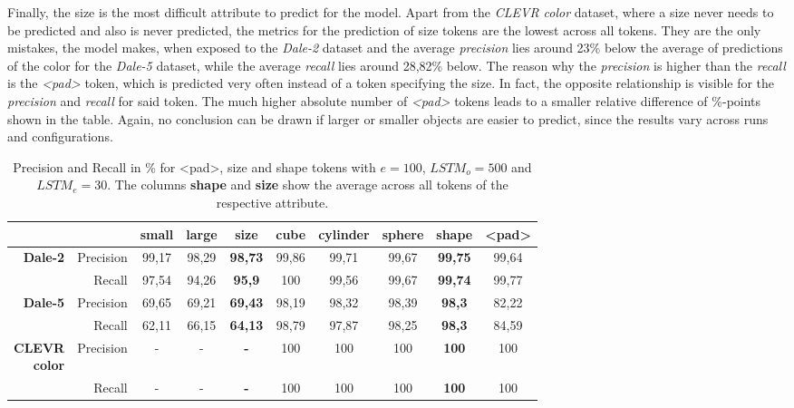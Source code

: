Finally, the size is the most difficult attribute to predict for the model.
Apart from the \emph{CLEVR color} dataset, where a size never needs to be predicted and also is never predicted, the metrics for the prediction of size tokens are the lowest across all tokens.
They are the only mistakes, the model makes, when exposed to the \emph{Dale-2} dataset and the average \emph{precision} lies around 23\% below the average of predictions of the color for the \emph{Dale-5} dataset, while the average \emph{recall} lies around 28,82\% below.
The reason why the \emph{precision} is higher than the \emph{recall} is the \emph{<pad>} token, which is predicted very often instead of a token specifying the size.
In fact, the opposite relationship is visible for the \emph{precision} and \emph{recall} for said token.
The much higher absolute number of \emph{<pad>} tokens leads to a smaller relative difference of \%-points shown in the table.
Again, no conclusion can be drawn if larger or smaller objects are easier to predict, since the results vary across runs and configurations.

\begin{table}[ht]
    \centering
    \begin{tabular}{rr|cc|c|ccc|c|c}
        \toprule
                                         &             & {small} & {large} & \textbf{size}  & {cube}  & {cylinder} & {sphere} & \textbf{shape} & {<pad>} \\\midrule
        \multirow{2}{*}{\textbf{Dale-2}} & {Precision} & {99,17} & {98,29} & \textbf{98,73} & {99,86} & {99,71}    & {99,67}  & \textbf{99,75} & {99,64} \\
                                         & {Recall}    & {97,54} & {94,26} & \textbf{95,9}  & {100}   & {99,56}    & {99,67}  & \textbf{99,74} & {99,77} \\\midrule
        \multirow{2}{*}{\textbf{Dale-5}} & {Precision} & {69,65} & {69,21} & \textbf{69,43} & {98,19} & {98,32}    & {98,39}  & \textbf{98,3}  & {82,22} \\
                                         & {Recall}    & {62,11} & {66,15} & \textbf{64,13} & {98,79} & {97,87}    & {98,25}  & \textbf{98,3}  & {84,59} \\\midrule
        \multirowcell{2}[0pt][r]{\textbf{CLEVR}                                                                                                          \\\textbf{color}} & {Precision}  & {-}     & {-}     & \textbf{-}     & {100}   & {100}      & {100}    & \textbf{100}   & {100}   \\
                                         & {Recall}    & {-}     & {-}     & \textbf{-}     & {100}   & {100}      & {100}    & \textbf{100}   & {100}   \\
        \bottomrule
    \end{tabular}
    \caption{Precision and Recall in \% for <pad>, size and shape tokens with $e=100$, $LSTM_o=500$ and $LSTM_e=30$. The columns \textbf{shape} and \textbf{size} show the average across all tokens of the respective attribute.}
    \label{tab:results:bb-re-generator_size-shape}
\end{table}


